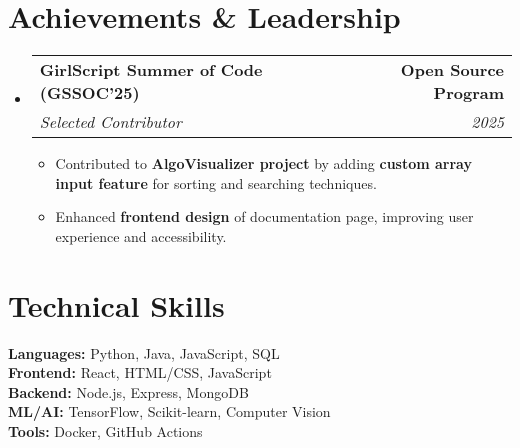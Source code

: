 \documentclass[letterpaper,10pt]{article}
\makeatletter
\newcommand{\resumeItem}[1]{
  \item\small{
    {#1 \vspace{-2pt}}
  }
}
\newcommand{\resumeSubheading}[4]{
  \vspace{-2pt}\item
    \begin{tabular*}{1.0\textwidth}[t]{l@{\extracolsep{\fill}}r}
      \textbf{#1} & \textbf{\small #2} \\
      \textit{\small#3} & \textit{\small #4} \\
    \end{tabular*}\vspace{-6pt}
}
\newcommand{\resumeSubHeadingListStart}{\begin{itemize}[leftmargin=0.0in, label={}, topsep=2pt, itemsep=2pt]}
\newcommand{\resumeSubHeadingListEnd}{\end{itemize}\vspace{-2pt}}
\newcommand{\resumeItemListStart}{\begin{itemize}[leftmargin=0.15in, topsep=2pt, itemsep=2pt]}
\newcommand{\resumeItemListEnd}{\end{itemize}\vspace{-2pt}}
\makeatother
\begin{document}
\section{Achievements \& Leadership}
\resumeSubHeadingListStart
  \resumeSubheading
    {GirlScript Summer of Code (GSSOC'25)}{Open Source Program}
    {Selected Contributor}{2025}
    \resumeItemListStart
      \resumeItem{Contributed to \textbf{AlgoVisualizer project} by adding \textbf{custom array input feature} for sorting and searching techniques.}
      \resumeItem{Enhanced \textbf{frontend design} of documentation page, improving user experience and accessibility.}
    \resumeItemListEnd
\resumeSubHeadingListEnd

\section{Technical Skills}
\begin{itemize}[leftmargin=0.1in, label={}, topsep=2pt, itemsep=2pt]
  \small{
    \item{
      \textbf{Languages:} Python, Java, JavaScript, SQL \\
      \textbf{Frontend:} React, HTML/CSS, JavaScript \\
      \textbf{Backend:} Node.js, Express, MongoDB \\
      \textbf{ML/AI:} TensorFlow, Scikit-learn, Computer Vision \\
      \textbf{Tools:} Docker, GitHub Actions
    }
  }
\end{itemize}
\end{document}
